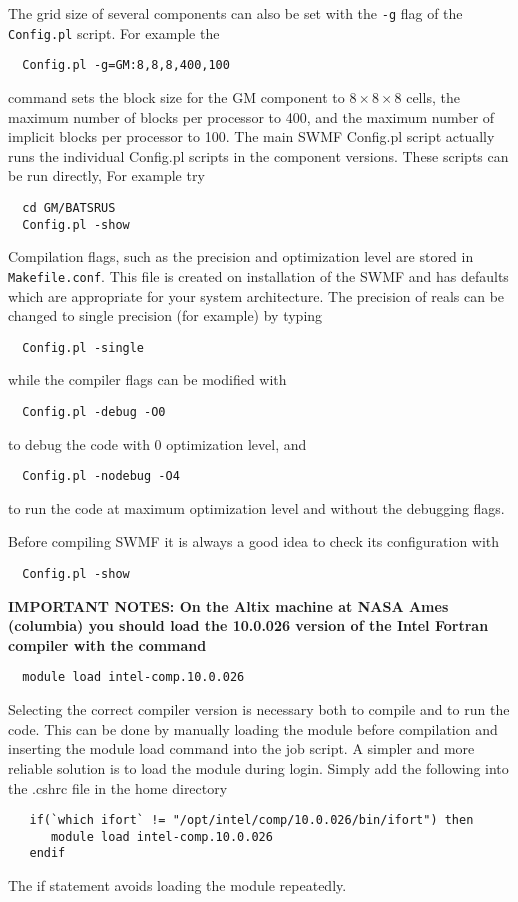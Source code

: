 The grid size of several components can also be set with the {\tt -g}
flag of the {\tt Config.pl} script. For example the 
\begin{verbatim}
  Config.pl -g=GM:8,8,8,400,100
\end{verbatim}
command sets the block size for the GM component to $8\times 8\times 8$ cells, 
the maximum number of blocks per processor to 400, 
and the maximum number of implicit blocks per processor to 100.
The main SWMF Config.pl script actually runs the individual Config.pl
scripts in the component versions. These scripts can be run directly,
For example try
\begin{verbatim}
  cd GM/BATSRUS
  Config.pl -show
\end{verbatim}
Compilation flags, such as the precision and optimization 
level are stored in {\tt Makefile.conf}. This file is created on
installation of the SWMF and has defaults which are appropriate for
your system architecture.  The precision of reals
can be changed to single precision (for example) by typing
\begin{verbatim}
  Config.pl -single
\end{verbatim}
while the compiler flags can be modified with
\begin{verbatim}
  Config.pl -debug -O0
\end{verbatim}
to debug the code with 0 optimization level, and
\begin{verbatim}
  Config.pl -nodebug -O4
\end{verbatim}
to run the code at maximum optimization level and without the debugging flags.

Before compiling SWMF it is always a good idea to check its configuration
with
\begin{verbatim}
  Config.pl -show
\end{verbatim}

{\bf IMPORTANT NOTES:
On the Altix machine at NASA Ames (columbia)
you should load the 10.0.026 version 
of the Intel Fortran compiler 
with the command
\begin{verbatim}
  module load intel-comp.10.0.026
\end{verbatim}
Selecting the correct compiler version is 
necessary both to compile and to run the code. This can be done
by manually loading the module before compilation and inserting
the module load command into the job script. A simpler and more
reliable solution is to load the module during login. 
Simply add the following into the .cshrc file in the home directory
\begin{verbatim}
   if(`which ifort` != "/opt/intel/comp/10.0.026/bin/ifort") then
      module load intel-comp.10.0.026
   endif
\end{verbatim}
The if statement avoids loading the module repeatedly.
}

